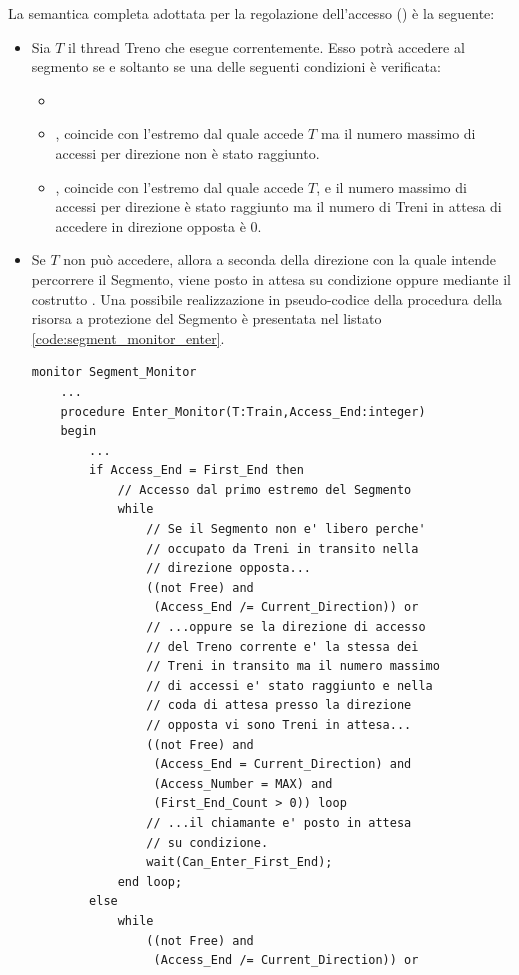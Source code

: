 \begin{description}
		La semantica completa adottata per la regolazione dell'accesso () è la seguente:
		\begin{itemize}
			\item Sia $T$ il thread Treno che esegue correntemente. Esso potrà accedere al segmento se e soltanto se una delle seguenti condizioni è verificata:
				\begin{itemize}
					\item {}
					\item {},  coincide con l'estremo dal quale accede $T$ ma il numero massimo di accessi per direzione non è stato raggiunto.
					\item {},  coincide con l'estremo dal quale accede $T$, e il numero massimo di accessi per direzione è stato raggiunto ma il numero di Treni in attesa di accedere in direzione opposta è 0.
				\end{itemize}
			\item Se $T$ non può accedere, allora a seconda della direzione con la quale intende percorrere il Segmento, viene posto in attesa su condizione  oppure  mediante il costrutto . Una possibile realizzazione in pseudo-codice della procedura  della risorsa  a protezione del Segmento è presentata nel listato \ref{code:segment_monitor_enter}.
\begin{lstlisting}[caption=\small{Procedura protetta \ttt{Enter\_Monitor} per l'accesso al Segmento.},label=code:segment_monitor_enter]
monitor Segment_Monitor
	...
	procedure Enter_Monitor(T:Train,Access_End:integer) 
	begin
		...
		if Access_End = First_End then
			// Accesso dal primo estremo del Segmento
			while 
				// Se il Segmento non e' libero perche'
				// occupato da Treni in transito nella
				// direzione opposta...
				((not Free) and 
				 (Access_End /= Current_Direction)) or 
				// ...oppure se la direzione di accesso
				// del Treno corrente e' la stessa dei 
				// Treni in transito ma il numero massimo
				// di accessi e' stato raggiunto e nella
				// coda di attesa presso la direzione 
				// opposta vi sono Treni in attesa...
				((not Free) and 
				 (Access_End = Current_Direction) and 
				 (Access_Number = MAX) and 
				 (First_End_Count > 0)) loop
				// ...il chiamante e' posto in attesa
				// su condizione.
				wait(Can_Enter_First_End);
			end loop;
		else
			while
				((not Free) and 
				 (Access_End /= Current_Direction)) or 

\end{lstlisting}
\end{itemize}
\end{description}
